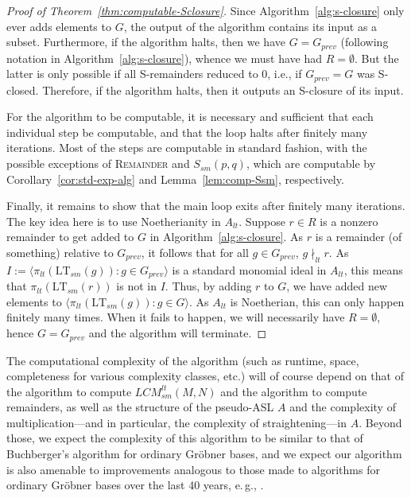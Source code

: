 \documentclass[11pt,reqno]{amsart}
\newcommand{\suchthat}{:}
\newcommand{\ltsm}{\text{LT}_{sm}}
\newcommand{\lcmlt}{LCM_{sm}^{lt}}
\newcommand{\Ssm}{S_{sm}}
\theoremstyle{definition}
\numberwithin{equation}{section}
\begin{document}
\begin{proof}[Proof of Theorem~\ref{thm:computable-Sclosure}]
Since Algorithm~\ref{alg:s-closure} only ever adds elements to $G$, the output of the algorithm contains its input as a subset. Furthermore, if the algorithm halts, then we have $G = G_{prev}$ (following notation in Algorithm~\ref{alg:s-closure}), whence we must have had $R = \emptyset$. But the latter is only possible if all S-remainders reduced to 0, i.e., if $G_{prev}=G$ was S-closed. Therefore, if the algorithm halts, then it outputs an S-closure of its input.

For the algorithm to be computable, it is necessary and sufficient that each individual step be computable, and that the loop halts after finitely many iterations. Most of the steps are computable in standard fashion, with the possible exceptions of \textsc{Remainder} and $\Ssm(p,q)$, which are computable by Corollary~\ref{cor:std-exp-alg} and Lemma~\ref{lem:comp-Ssm}, respectively. 


Finally, it remains to show that the main loop exits after finitely many iterations. The key idea here is to use Noetherianity in $A_{lt}$. Suppose $r \in R$ is a nonzero remainder to get added to $G$ in Algorithm~\ref{alg:s-closure}. As $r$ is a remainder (of something) relative to $G_{prev}$, it follows that for all $g \in G_{prev}$, $g \nmid_{lt} r$. As $I := \langle \pi_{lt}(\ltsm(g)) \suchthat g \in G_{prev} \rangle$ is a standard monomial ideal in $A_{lt}$, this means that $\pi_{lt}(\ltsm(r))$ is not in $I$. Thus, by adding $r$ to $G$, we have added new elements to $\langle \pi_{lt}(\ltsm(g)) \suchthat g \in G \rangle$. As $A_{lt}$ is Noetherian, this can only happen finitely many times. When it fails to happen, we will necessarily have $R = \emptyset$, hence $G=G_{prev}$ and the algorithm will terminate.
\end{proof}

\begin{remark} The computational complexity of the algorithm (such as runtime, space, completeness for various complexity classes, etc.) will of course depend on that of the algorithm to compute $\lcmlt(M,N)$ and the algorithm to compute remainders, as well as the structure of the pseudo-ASL $A$ and the complexity of multiplication---and in particular, the complexity of straightening---in $A$. Beyond those, we expect the complexity of this algorithm to be similar to that of Buchberger's algorithm for ordinary Gröbner bases, and we expect our algorithm is also amenable to improvements analogous to those made to algorithms for ordinary Gröbner bases over the last 40 years, e.\,g., \cite{GBsurvey, GB50, F4, F5}.
\end{remark}
\end{document}
